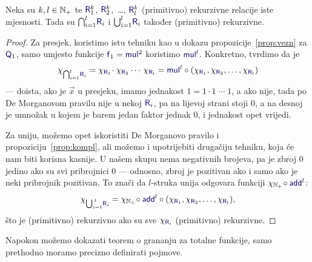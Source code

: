 \begin{propozicija}[{name=[višestruke unije i presjeci čuvaju (primitivnu) rekurzivnost]}]\label{prop:skupl}
Neka su $k,l\in{\mathbb N}_+$ te $\f R_1^k$, $\f R_2^k$,~\ldots, $\f R_l^k$ (primitivno) rekurzivne relacije iste mjesnosti. Tada su $\bigcap_{i=1}^l\!\f R_i$ i $\bigcup_{i=1}^l\!\f R_i$ također (primitivno) rekurzivne.
\end{propozicija}
\begin{proof}
Za presjek, koristimo istu tehniku kao u dokazu propozicije~\ref{prop:vezn} za $\f Q_1$, samo umjesto funkcije $\f f_1=\f{mul}^2$ koristimo $\f{mul}^l$. Konkretno, tvrdimo da je \begin{equation}
    \chi_{\bigcap_{i=1}^l\!\f R_i}=\chi_{\f R_1}\!\cdot\chi_{\f R_2}\dotsb\,\chi_{\f R_l}=\f{mul}^l\circ(\chi_{\f R_1},\chi_{\f R_2},\dotsc,\chi_{\f R_l})
\end{equation}
    --- doista, ako je $\vec x$ u presjeku, imamo jednakost $1=1\cdot1\mathbin{\dotsb}1$, a ako nije, tada po De Morganovom pravilu nije u nekoj $\f{R}_i$, pa na lijevoj strani stoji $0$, a na desnoj je umnožak u kojem je barem jedan faktor jednak $0$, i jednakost opet vrijedi.

Za uniju, možemo opet iskoristiti De Morganovo pravilo i propoziciju~\ref{prop:kompl}, ali možemo i upotrijebiti drugačiju tehniku, koja će nam biti korisna kasnije. U našem skupu nema negativnih brojeva, pa je zbroj $0$ jedino ako su svi pribrojnici $0$ --- odnosno, zbroj je pozitivan ako i samo ako je neki pribrojnik pozitivan. To znači da %
    $l$-struka unija odgovara funkciji $\chi_{\N_+}\!\circ\f{add}^l$:
\begin{equation}
\label{eq:unk}
	\chi_{\bigcup_{i=1}^{\;l}\!\f R_i}=\chi_{\N_+}\!\circ\f{add}^l\circ(\chi_{\f R_1},\chi_{\f R_2},\dotsc,\chi_{\f R_l})\text,
\end{equation}
što je (primitivno) rekurzivno ako su sve $\chi_{\f R_i}$ (primitivno) rekurzivne.
\end{proof}


Napokon možemo dokazati teorem o grananju za totalne funkcije, samo prethodno moramo precizno definirati pojmove.

